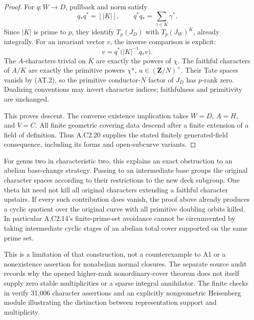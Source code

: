 \begin{proof}
For $q:W\to D$, pullback and norm satisfy
\[
 q_*q^*=[|K|],\qquad
 q^*q_*=\sum_{\gamma\in K}\gamma^*.
\]
Since $|K|$ is prime to $p$, they identify
$T_p(J_D)$ with $T_p(J_W)^K$, already
integrally. For an invariant vector $v$, the
inverse comparison is explicit:
\[
                   v=q^*\bigl(|K|^{-1}q_*v\bigr).
\]
The $A$-characters trivial on $K$ are exactly
the powers of $\chi$. The faithful characters
of $A/K$ are exactly the primitive powers
$\chi^u$, $u\in(\mathbf Z/N)^\times$.
Their Tate spaces vanish by (AT.2), so the
primitive conductor-$N$ factor of $J_D$ has
$p$-rank zero.
Dualizing conventions may invert character
indices; faithfulness and primitivity are
unchanged.

This proves descent. The converse existence
implication takes $W=D$, $A=H$, and $V=C$.
All finite geometric covering data descend
after a finite extension of a field of
definition. Thus A.C2.20 supplies the stated
finitely generated-field consequence, including
its forms and open-subcurve variants.
\end{proof}

For genus two in characteristic two, this
explains an exact obstruction to an abelian
base-change strategy. Passing to an
intermediate base groups the original
character spaces according to their
restrictions to the new deck subgroup.
One theta hit need not kill all original
characters extending a faithful character
upstairs. If every such contribution does
vanish, the proof above already produces a
cyclic quotient over the original curve
with all primitive doubling orbits killed.
In particular A.C2.14's finite-prime-set
avoidance cannot be circumvented by taking
intermediate cyclic stages of an abelian
total cover supported on the same prime set.

This is a limitation of that construction,
not a counterexample to A1 or a
nonexistence assertion for nonabelian
normal closures. The separate source audit
records why the opened higher-rank
nonordinary-cover theorem does not itself
supply zero stable multiplicities or a
sparse integral annihilator.
The finite checks in
verify 31,006 character assertions and
an explicitly nongeometric Heisenberg
module illustrating the distinction
between representation support and
multiplicity.
